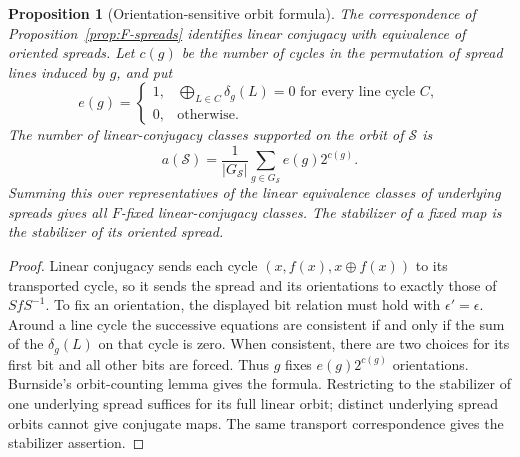 \documentclass[11pt]{article}
\newtheorem{proposition}[theorem]{Proposition}
\begin{document}
\begin{proposition}[Orientation-sensitive orbit formula]\label{prop:oriented-Burnside}
The correspondence of Proposition~\ref{prop:F-spreads} identifies linear
conjugacy with equivalence of oriented spreads. Let $c(g)$ be the number of
cycles in the permutation of spread lines induced by $g$, and put
\[
e(g)=\begin{cases}
1,&\displaystyle\bigoplus_{L\in C}\delta_g(L)=0
       \text{ for every line cycle }C,\\
0,&\text{otherwise}.
\end{cases}
\]
The number of linear-conjugacy classes supported on the orbit of $\mathcal S$ is
\[
a(\mathcal S)=\frac{1}{|G_{\mathcal S}|}
      \sum_{g\in G_{\mathcal S}}e(g)2^{c(g)}.
\]
Summing this over representatives of the linear equivalence classes of
underlying spreads gives all $F$-fixed linear-conjugacy classes.
The stabilizer of a fixed map is the stabilizer of its oriented spread.
\end{proposition}
\begin{proof}
Linear conjugacy sends each cycle $(x,f(x),x\oplus f(x))$ to its transported
cycle, so it sends the spread and its orientations to exactly those of
$SfS^{-1}$. To fix an orientation, the displayed bit relation must hold
with $\epsilon'=\epsilon$. Around a line cycle the successive equations
are consistent if and only if the sum of the $\delta_g(L)$ on that cycle
is zero. When consistent, there are two choices for its first bit and all
other bits are forced. Thus $g$ fixes $e(g)2^{c(g)}$ orientations.
Burnside's orbit-counting lemma gives the formula. Restricting to the
stabilizer of one underlying spread suffices for its full linear orbit;
distinct underlying spread orbits cannot give conjugate maps.
The same transport correspondence gives the stabilizer assertion.
\end{proof}
\end{document}
